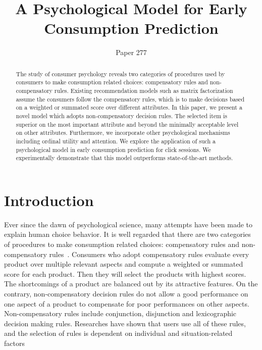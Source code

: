 \documentclass[sigconf]{acmart}
\begin{document}
\title{A Psychological Model for Early Consumption Prediction}


\author{Paper 277}


\begin{abstract}
The study of consumer psychology reveals two categories of procedures used by consumers to make consumption related choices: compensatory rules and non-compensatory rules. Existing recommendation models such as matrix factorization assume the consumers follow the compensatory rules, which is to make decisions based on a weighted or summated score over different attributes. In this paper, we present a novel model which adopts non-compensatory decision rules. The selected item is superior on the most  important attribute and beyond the minimally acceptable level on other attributes. Furthermore, we incorporate other psychological mechanisms including ordinal utility and attention.  We explore the application of such a psychological model in early consumption prediction for click sessions. We experimentally demonstrate that this model outperforms state-of-the-art methods.
\end{abstract}


\maketitle
\section{Introduction}\label{sec:introduction}

Ever since the dawn of psychological science, many attempts have been made to explain human choice behavior. It is well regarded that there are two categories of procedures to make consumption related choices: compensatory rules and non-compensatory rules~\cite{Engel1986Consumer}. Consumers who adopt compensatory rules evaluate every product over multiple relevant aspects and compute a weighted or summated score for each product. Then they will select the products with highest scores. The shortcomings of a product are balanced out by its attractive features. On the contrary, non-compensatory decision rules do not allow a good performance on one aspect of a product to compensate for poor performances on other aspects. Non-compensatory rules include conjunction, disjunction and lexicographic decision making rules. Researches have shown that users use all of these rules, and the selection of rules is dependent on individual and situation-related factors~\cite{Park1976Effect} 
\end{document}
